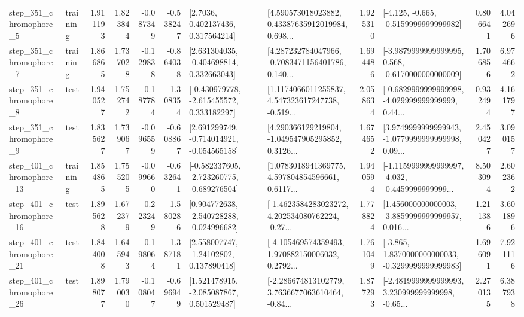\begin{tabular}{llrrrrllrlrr}
   step\_351\_chromophore\_5 &  training &      1.911193 &    1.823844 &     -0.087349 & -0.538247 &          [2.7036, 0.402137436, 0.317564214] &  [4.590573018023882, 0.43387635912019984, 0.698... &       1.925310 &              [-4.125, -0.665, -0.5159999999999982] &            0.806641 &          4.042696 \\
   step\_351\_chromophore\_7 &  training &      1.866865 &    1.737028 &     -0.129838 & -0.864038 &    [2.631304035, -0.404698814, 0.332663043] &  [4.287232784047966, -0.7083471156401786, 0.140... &       1.694486 &  [-3.9879999999999995, 0.568, -0.6170000000000009] &            1.706856 &          6.974662 \\
   step\_351\_chromophore\_8 &      test &      1.940527 &    1.752742 &     -0.187784 & -1.308354 &   [-0.430979778, -2.615455572, 0.333182297] &  [1.1174066011255837, 4.547323617247738, -0.519... &       2.058634 &  [-0.6829999999999998, -4.029999999999999, 0.44... &            0.932494 &          4.161797 \\
   step\_351\_chromophore\_9 &      test &      1.835627 &    1.739067 &     -0.096559 & -0.608867 &   [2.691299749, -0.714014921, -0.054565158] &  [4.290366129219804, -1.049547905295852, 0.3126... &       1.674652 &  [3.9749999999999943, -1.0779999999999998, 0.09... &            2.450427 &          3.090157 \\
  step\_401\_chromophore\_13 &  training &      1.854865 &    1.755205 &     -0.099660 & -0.632641 &  [-0.582337605, -2.723260775, -0.689276504] &  [1.0783018941369775, 4.597804854596661, 0.6117... &       1.940594 &  [-1.1159999999999997, -4.032, -0.4459999999999... &            8.503094 &          2.602362 \\
  step\_401\_chromophore\_16 &      test &      1.895628 &    1.672379 &     -0.223249 & -1.580286 &   [0.904772638, -2.540728288, -0.024996682] &  [-1.4623584283023272, 4.202534080762224, -0.27... &       1.778824 &  [1.456000000000003, -3.8859999999999957, 0.016... &            1.211386 &          3.601896 \\
  step\_401\_chromophore\_21 &      test &      1.844008 &    1.645943 &     -0.198064 & -1.387181 &     [2.558007747, -1.24102802, 0.137890418] &  [-4.105469574359493, 1.970882150006032, 0.2792... &       1.761049 &  [-3.865, 1.8370000000000033, -0.3299999999999983] &            1.696091 &          7.921116 \\
  step\_401\_chromophore\_26 &      test &      1.898077 &    1.790030 &     -0.108047 & -0.696949 &    [1.521478915, -2.085087867, 0.501529487] &  [-2.286674813102779, 3.7636677063610464, -0.84... &       1.877293 &  [-2.4819999999999993, 3.230999999999998, -0.65... &            2.270135 &          6.387938 \\

\end{tabular}
